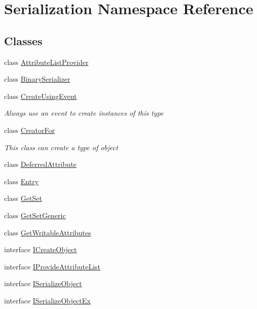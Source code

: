 \hypertarget{namespace_serialization}{}\section{Serialization Namespace Reference}
\label{namespace_serialization}
\subsection*{Classes}
\begin{DoxyCompactItemize}
\item 
class \hyperlink{class_serialization_1_1_attribute_list_provider}{Attribute\+List\+Provider}
\item 
class \hyperlink{class_serialization_1_1_binary_serializer}{Binary\+Serializer}
\item 
class \hyperlink{class_serialization_1_1_create_using_event}{Create\+Using\+Event}
\begin{DoxyCompactList}\small\item\em Always use an event to create instances of this type \end{DoxyCompactList}\item 
class \hyperlink{class_serialization_1_1_creator_for}{Creator\+For}
\begin{DoxyCompactList}\small\item\em This class can create a type of object \end{DoxyCompactList}\item 
class \hyperlink{class_serialization_1_1_deferred_attribute}{Deferred\+Attribute}
\item 
class \hyperlink{class_serialization_1_1_entry}{Entry}
\item 
class \hyperlink{class_serialization_1_1_get_set}{Get\+Set}
\item 
class \hyperlink{class_serialization_1_1_get_set_generic}{Get\+Set\+Generic}
\item 
class \hyperlink{class_serialization_1_1_get_writable_attributes}{Get\+Writable\+Attributes}
\item 
interface \hyperlink{interface_serialization_1_1_i_create_object}{I\+Create\+Object}
\item 
interface \hyperlink{interface_serialization_1_1_i_provide_attribute_list}{I\+Provide\+Attribute\+List}
\item 
interface \hyperlink{interface_serialization_1_1_i_serialize_object}{I\+Serialize\+Object}
\item 
interface \hyperlink{interface_serialization_1_1_i_serialize_object_ex}{I\+Serialize\+Object\+Ex}

\end{DoxyCompactItemize}
